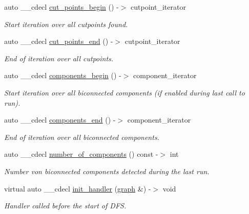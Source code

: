 \begin{DoxyCompactItemize}
auto \+\_\+\+\_\+cdecl \mbox{\hyperlink{classbiconnectivity_ac1509d3ad82cdac1b55f50f051e39dde}{cut\+\_\+points\+\_\+begin}} () -\/$>$ cutpoint\+\_\+iterator
\begin{DoxyCompactList}\small\item\em Start iteration over all cutpoints found. \end{DoxyCompactList}\item 
auto \+\_\+\+\_\+cdecl \mbox{\hyperlink{classbiconnectivity_abd704c5c467bd63ae3d16ea8bd2af7b5}{cut\+\_\+points\+\_\+end}} () -\/$>$ cutpoint\+\_\+iterator
\begin{DoxyCompactList}\small\item\em End of iteration over all cutpoints. \end{DoxyCompactList}\item 
auto \+\_\+\+\_\+cdecl \mbox{\hyperlink{classbiconnectivity_af0b3daec2b230800ac0bfb9d4671687f}{components\+\_\+begin}} () -\/$>$ component\+\_\+iterator
\begin{DoxyCompactList}\small\item\em Start iteration over all biconnected components (if enabled during last call to run). \end{DoxyCompactList}\item 
auto \+\_\+\+\_\+cdecl \mbox{\hyperlink{classbiconnectivity_ac6b38a686d8008f9ec081006bf4a945e}{components\+\_\+end}} () -\/$>$ component\+\_\+iterator
\begin{DoxyCompactList}\small\item\em End of iteration over all biconnected components. \end{DoxyCompactList}\item 
auto \+\_\+\+\_\+cdecl \mbox{\hyperlink{classbiconnectivity_a831d05bc43e9dffc37132439ca421a97}{number\+\_\+of\+\_\+components}} () const -\/$>$ int
\begin{DoxyCompactList}\small\item\em Number von biconnected components detected during the last run. \end{DoxyCompactList}\item 
virtual auto \+\_\+\+\_\+cdecl \mbox{\hyperlink{classbiconnectivity_acdde9c069598de57bb78417f85d82bc7}{init\+\_\+handler}} (\mbox{\hyperlink{classgraph}{graph}} \&) -\/$>$ void
\begin{DoxyCompactList}\small\item\em Handler called before the start of D\+FS. \end{DoxyCompactList}\item 

\end{DoxyCompactItemize}
